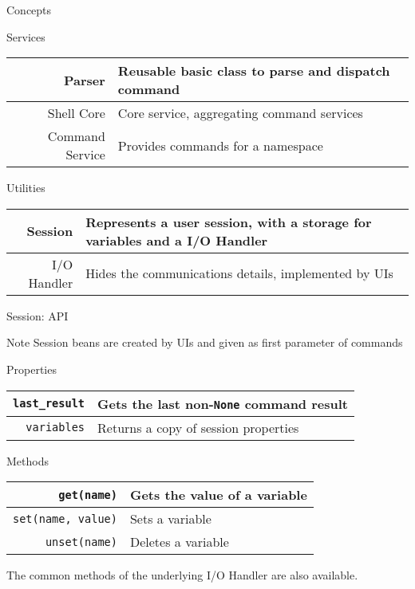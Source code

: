 \begin{frame}{Concepts}
\begin{block}{Services}
\centering
\begin{tabular}{r p{}}
Parser & Reusable basic class to parse and dispatch command \\
\hline
Shell Core & Core service, aggregating command services \\
\hline
Command Service & Provides commands for a namespace \\
\end{tabular}
\end{block}

\begin{block}{Utilities}
\centering
\begin{tabular}{r p{}}
Session & Represents a user session, with a storage for variables and a I/O Handler \\
\hline
I/O Handler & Hides the communications details, implemented by UIs \\
\end{tabular}
\end{block}
\end{frame}

\begin{frame}{Session: API}
\begin{small}
\begin{exampleblock}{Note}
Session beans are created by UIs and given as first parameter of commands
\end{exampleblock}

\begin{block}{Properties}
\centering
\begin{tabular}{rl}
\texttt{last\_result} & Gets the last non-\texttt{None} command result \\
\hline
\texttt{variables} & Returns a copy of session properties \\
\end{tabular}
\end{block}

\begin{block}{Methods}
\begin{center}
\begin{tabular}{rl}
\texttt{get({\scriptsize name})} & Gets the value of a variable \\
\hline
\texttt{set({\scriptsize name, value})} & Sets a variable \\
\hline
\texttt{unset({\scriptsize name})} & Deletes a variable \\
\end{tabular}
\end{center}
The common methods of the underlying I/O Handler are also available.
\end{block}
\end{small}
\end{frame}


